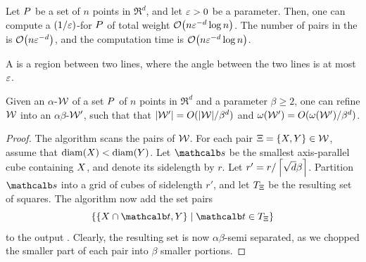 \documentclass[12pt]{article}%
\begin{document}
\begin{theorem}
    Let $P$ be a set of $n$ points in $\Re^d$, and let $\varepsilon > 0$ be
    a parameter. Then, one can compute a $(1/\varepsilon)$-\SSPD for $P$ of
    total weight $\Of\pth{n \eps^{-d} \log n}$. The number of pairs in
    the \SSPD is $\Of\pth{n \eps^{-d}}$, and the computation time is
    $\Of\pth{ n \eps^{-d} \log n }$.
\end{theorem}

\begin{defn}%
A  is a region between two lines, where
the angle between the two lines is at most $\varepsilon$.
\end{defn}

\begin{lemma}
    Given an $\alpha$-\SSPD $\mathcal{W}$ of a set $P$ of $n$ points in
    $\Re^d$ and a parameter $\beta \geq 2$, one can refine $\mathcal{W}$ into an
    $\alpha\beta$-\SSPD $\mathcal{W}'$, such that that
    $|\mathcal{W}'| = O(|\mathcal{W}|/\beta^d)$ and
    $\WeightX{\WS'} = O(\WeightX{\WS'}/\beta^d)$.
\end{lemma}
\begin{proof}
    The algorithm scans the pairs of $\mathcal{W}$. For each pair
    $\Xi = \{ X, Y \} \in \mathcal{W}$, assume that
    $\diameterX{\PSX} < \diameterX{\PSY}$. Let $\sqr$ be the smallest
    axis-parallel cube containing $X$, and denote its sidelength by $r$.  Let
    $r' = r / \left\lceil {\sqrt{d} \beta } \right\rceil$.  Partition $\sqr$ into a grid
    of cubes of sidelength $r'$, and let $T_\Xi$ be the resulting
    set of squares. The algorithm now add the set pairs
    \begin{equation*}
        \Set{ \{ \PSX \cap \sqrA, \PSY \} }{ \sqrA \in T_\Pair }
    \end{equation*}
    to the output \SSPD. Clearly, the resulting set is now
    $\alpha\beta$-semi separated, as we chopped the smaller part of
    each pair into $\beta$ smaller portions.
\end{proof}
\end{document}

